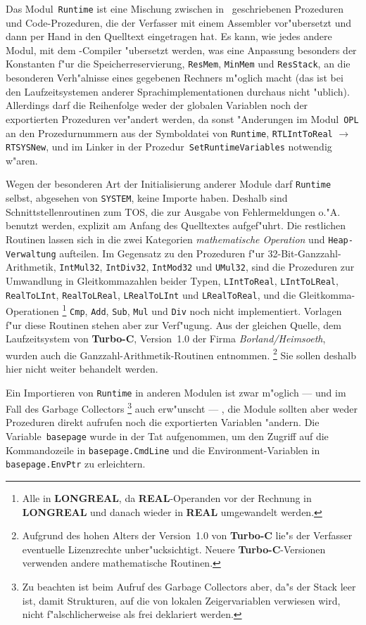 \medskip
Das Modul~{\tt Runtime} ist eine Mischung zwischen in \oberon\ geschriebenen
Prozeduren und Code-Prozeduren, die der Verfasser mit einem Assembler
vor"ubersetzt und dann per Hand in den Quelltext eingetragen hat.
Es kann, wie jedes andere Modul, mit dem \oberon-Compiler "ubersetzt werden,
was eine Anpassung besonders der Konstanten f"ur die Speicherreservierung,
{\tt ResMem}, {\tt MinMem} und {\tt ResStack}, an die besonderen Verh"alnisse
eines gegebenen Rechners m"oglich macht (das ist bei den Laufzeitsystemen anderer
Sprachimplementationen durchaus nicht "ublich).
Allerdings darf die Reihenfolge weder der globalen Variablen noch der
exportierten Prozeduren ver"andert werden, da sonst "Anderungen im Modul~{\tt OPL}
an den Prozedurnummern aus der Symboldatei von {\tt Runtime}, {\tt RTLIntToReal} $\to$
{\tt RTSYSNew}, und im Linker in der Prozedur~{\tt SetRuntimeVariables} notwendig
w"aren.

Wegen der besonderen Art der Initialisierung anderer Module darf {\tt Runtime}
selbst, abgesehen von {\tt SYSTEM}, keine Importe haben.
Deshalb sind Schnittstellenroutinen zum TOS, die zur Ausgabe von Fehlermeldungen o."A.
benutzt werden, explizit am Anfang des Quelltextes aufgef"uhrt.
Die restlichen Routinen lassen sich in die zwei Kategorien {\em mathematische Operation\/}
und {\tt Heap-Verwaltung} aufteilen.
Im Gegensatz zu den Prozeduren f"ur 32-Bit-Ganzzahl-Arithmetik, {\tt IntMul32},
{\tt IntDiv32}, {\tt IntMod32} und {\tt UMul32}, sind die Prozeduren zur
Umwandlung in Gleitkommazahlen beider Typen, {\tt LIntToReal}, {\tt LIntToLReal},
{\tt RealToLInt}, {\tt RealToLReal}, {\tt LRealToLInt} und {\tt LRealToReal},
und die Gleitkomma-Operationen%
\footnote{Alle in {\bf LONGREAL}, da {\bf REAL}-Operanden vor der Rechnung
in {\bf LONGREAL}  und danach wieder in {\bf REAL} umgewandelt werden.}
{\tt Cmp}, {\tt Add}, {\tt Sub}, {\tt Mul} und {\tt Div} noch nicht implementiert.
Vorlagen f"ur diese Routinen stehen aber zur Verf"ugung.
Aus der gleichen Quelle, dem Laufzeitsystem von {\bf Turbo-C}, Version~1.0 der Firma
{\sl Borland/Heimsoeth}, wurden auch die Ganzzahl-Arithmetik-Routinen entnommen.%
\footnote{Aufgrund des hohen Alters der Version~1.0 von {\bf Turbo-C} lie"s
der Verfasser eventuelle Lizenzrechte unber"ucksichtigt.
Neuere {\bf Turbo-C}-Versionen verwenden andere mathematische Routinen.}
Sie sollen deshalb hier nicht weiter behandelt werden.

Ein Importieren von {\tt Runtime} in anderen Modulen ist zwar m"oglich ---
und im Fall des Garbage Collectors%
\footnote{Zu beachten ist beim Aufruf des Garbage Collectors aber, da"s
der Stack leer ist, damit Strukturen, auf die von lokalen Zeigervariablen
verwiesen wird, nicht f"alschlicherweise als frei deklariert werden.}
auch erw"unscht --- , die Module sollten
aber weder Prozeduren direkt aufrufen noch die exportierten Variablen "andern.
Die Variable~{\tt basepage} wurde in der Tat aufgenommen, um den Zugriff auf
die Kommandozeile in {\tt basepage\caret.CmdLine} und die Environment-Variablen in
{\tt basepage\caret.EnvPtr} zu erleichtern.

